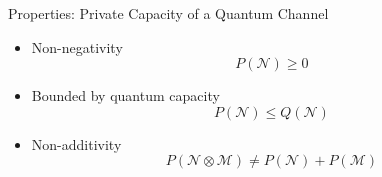 \begin{frame}{Properties: Private Capacity of a Quantum Channel}
\begin{itemize}
    \setlength{\itemsep}{1.5em}
    \item Non-negativity
    $$P(\mathcal{N}) \geq 0$$
    \item Bounded by quantum capacity
    $$P(\mathcal{N}) \leq Q(\mathcal{N})$$
    \item Non-additivity
    $$P(\mathcal{N} \otimes \mathcal{M}) \neq P(\mathcal{N}) + P(\mathcal{M})$$
\end{itemize}
\end{frame}
